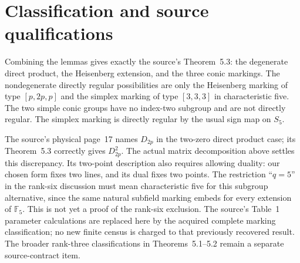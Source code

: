 \documentclass[11pt]{article}
\newcommand{\F}{\mathbb F}\newcommand{\PSL}{\operatorname{PSL}}
\begin{document}
\enlargethispage{2\baselineskip}
\section*{Classification and source qualifications}
Combining the lemmas gives exactly the source's Theorem~5.3: the
degenerate direct product, the Heisenberg extension, and the three conic
markings. The nondegenerate directly regular possibilities are only the
Heisenberg marking of type $[p,2p,p]$ and the simplex marking of type
$[3,3,3]$ in characteristic five. The two simple conic groups have no
index-two subgroup and are not directly regular. The simplex marking
is directly regular by the usual sign map on $S_5$.

The source's physical page~17 names $D_{2p}$ in the two-zero direct
product case; its Theorem~5.3 correctly gives $D_{2p}^2$. The actual
matrix decomposition above settles this discrepancy. Its two-point
description also requires allowing duality: our chosen form fixes two
lines, and its dual fixes two points. The restriction
``$q=5$'' in the rank-six discussion must mean characteristic five
for this subgroup alternative, since the same natural subfield marking
embeds for every extension of $\F_5$. This is not yet a proof of the
rank-six exclusion. The source's Table~1 parameter calculations are
replaced here by the acquired complete marking classification; no new
finite census is charged to that previously recovered result. The broader
rank-three classifications in Theorems~5.1--5.2 remain a separate
source-contract item.
\end{document}
